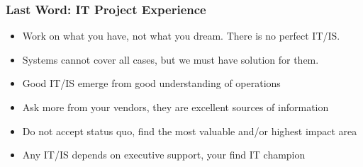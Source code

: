 \documentclass[10pt,handout,notes=show]{beamer}
\begin{document}
\begin{frame}
  \frametitle{Last Word: IT Project Experience}

  \begin{itemize}
    \item Work on \alert{what you have}, not what you dream. There is no perfect IT/IS.
    \item Systems cannot cover all cases, but we must \alert{have solution} for them.
    \item Good IT/IS emerge from good \alert{understanding} of operations
    \item Ask more from \alert{your vendors}, they are excellent sources of information
    \item Do not accept status quo, find the most valuable and/or highest impact area
    \item Any IT/IS depends on \alert{executive support}, your find IT champion
  \end{itemize}


\end{frame}

\end{document}

